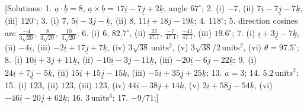 \documentclass[
  english,
  11pt,
  oneside]{book}
\theoremstyle{definition}
\theoremstyle{definition}
\theoremstyle{definition}
\theoremstyle{definition}
\theoremstyle{remark}
\begin{document}
{[}Solutions:
1. \(\underline{a}\cdot\underline{b}=8\), \(\underline{a}\times\underline{b} = 17\underline{i}-7\underline{j}+2\underline{k}\), angle \(67^{\circ}\);
2. (i) \(-7\), (ii) \(7\underline{i}-7\underline{j}-7\underline{k}\), (iii) \(120^{\circ}\);
3. (i) \(7\), \(5\underline{i}-3\underline{j}-\underline{k}\), (ii) \(8\), \(11\underline{i}+18\underline{j}-19\underline{k}\);
4. \(118^{\circ}\);
5. direction cosines are \(\frac{-4}{3\sqrt{20}}\), \(\frac{8}{3\sqrt{20}}\), \(\frac{10}{3\sqrt{20}}\);
6. (i) \(6\), \(82.7^{\circ}\), (ii) \(\frac{22}{47.1}\), \(\frac{-7}{47.1}\), \(\frac{-41}{47.1}\), (iii) \(19.6^{\circ}\);
7. (i) \(\underline{i}+3\underline{j}-7\underline{k}\), (ii) \(-4\underline{i}\), (iii) \(-2\underline{i}+17\underline{j}+7\underline{k}\), (iv) \(3\sqrt{38}\,\text{units}^2\), (v) \(3\sqrt{38}/2\,\text{units}^2\), (vi) \(\theta=97.5^{\circ}\);
8. (i) \(10\underline{i}+3\underline{j}+11\underline{k}\), (ii) \(-10\underline{i}-3\underline{j}-11\underline{k}\), (iii) \(-20\underline{i}-6\underline{j}-22\underline{k}\);
9. (i) \(24\underline{i}+7\underline{j}-5\underline{k}\), (ii) \(15\underline{i}+15\underline{j}-15\underline{k}\), (iii) \(-5\underline{i}+35\underline{j}+25\underline{k}\);
13. \(a=3\);
14. \(5.2\,\text{units}^2\);
15. (i) \(123\), (ii) \(123\), (iii) \(123\), (iv) \(44\underline{i}-38\underline{j}+14\underline{k}\), (v) \(2\underline{i}+58\underline{j}-54\underline{k}\), (vi) \(-46\underline{i} -20\underline{j}+62\underline{k}\);
16. \(3\,\text{units}^3\);
17. \(-9/71\);{]}

\cleardoublepage
{}
\printindex
\end{document}
